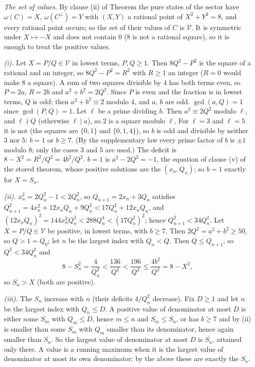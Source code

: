 \emph{The set of values.} By clause (ii) of Theorem  the pure states of the sector have $\omega(C) = X$, $\omega(C^{\perp}) = Y$ with $(X, Y)$ a rational point of $X^{2} + Y^{2} = 8$, and every rational point occurs; so the set of their values of $C$ is $\mathcal{V}$. It is symmetric under $X \mapsto -X$ and does not contain $0$ ($8$ is not a rational square), so it is enough to treat the positive values.

\emph{(i).} Let $X = P/Q \in \mathcal{V}$ in lowest terms, $P, Q \ge 1$. Then $8Q^{2} - P^{2}$ is the square of a rational and an integer, so $8Q^{2} - P^{2} = R^{2}$ with $R \ge 1$ an integer ($R = 0$ would make $8$ a square). A sum of two squares divisible by $4$ has both terms even, so $P = 2a$, $R = 2b$ and $a^{2} + b^{2} = 2Q^{2}$. Since $P$ is even and the fraction is in lowest terms, $Q$ is odd; then $a^{2} + b^{2} \equiv 2$ modulo $4$, and $a$, $b$ are odd. $\gcd(a, Q) = 1$ since $\gcd(P, Q) = 1$. Let $\ell$ be a prime dividing $b$. Then $a^{2} \equiv 2Q^{2}$ modulo $\ell$, and $\ell \nmid Q$ (otherwise $\ell \mid a$), so $2$ is a square modulo $\ell$. For $\ell = 3$ and $\ell = 5$ it is not (the squares are $\{0, 1\}$ and $\{0, 1, 4\}$), so $b$ is odd and divisible by neither $3$ nor $5$: $b = 1$ or $b \ge 7$. (By the supplementary law every prime factor of $b$ is $\pm 1$ modulo $8$; only the cases $3$ and $5$ are used.) The deficit is $8 - X^{2} = R^{2}/Q^{2} = 4b^{2}/Q^{2}$. $b = 1$ is $a^{2} - 2Q^{2} = -1$, the equation of clause (v) of the stored theorem, whose positive solutions are the $(x_{n}, Q_{n})$; so $b = 1$ exactly for $X = S_{n}$.

\emph{(ii).} $x_{n}^{2} = 2Q_{n}^{2} - 1 < 2Q_{n}^{2}$, so $Q_{n+1} = 2x_{n} + 3Q_{n}$ satisfies $Q_{n+1}^{2} = 4x_{n}^{2} + 12x_{n}Q_{n} + 9Q_{n}^{2} < 17Q_{n}^{2} + 12x_{n}Q_{n}$, and $(12x_{n}Q_{n})^{2} = 144x_{n}^{2}Q_{n}^{2} < 288Q_{n}^{4} < (17Q_{n}^{2})^{2}$; hence $Q_{n+1}^{2} < 34Q_{n}^{2}$. Let $X = P/Q \in \mathcal{V}$ be positive, in lowest terms, with $b \ge 7$. Then $2Q^{2} = a^{2} + b^{2} \ge 50$, so $Q > 1 = Q_{0}$; let $n$ be the largest index with $Q_{n} < Q$. Then $Q \le Q_{n+1}$, so $Q^{2} < 34Q_{n}^{2}$ and
\[
8 - S_{n}^{2} = \frac{4}{Q_{n}^{2}} < \frac{136}{Q^{2}} < \frac{196}{Q^{2}} \le \frac{4b^{2}}{Q^{2}} = 8 - X^{2},
\]
so $S_{n} > X$ (both are positive).

\emph{(iii).} The $S_{n}$ increase with $n$ (their deficits $4/Q_{n}^{2}$ decrease). Fix $D \ge 1$ and let $n$ be the largest index with $Q_{n} \le D$. A positive value of denominator at most $D$ is either some $S_{m}$ with $Q_{m} \le D$, hence $m \le n$ and $S_{m} \le S_{n}$, or has $b \ge 7$ and by (ii) is smaller than some $S_{m}$ with $Q_{m}$ smaller than its denominator, hence again smaller than $S_{n}$. So the largest value of denominator at most $D$ is $S_{n}$, attained only there. A value is a running maximum when it is the largest value of denominator at most its own denominator; by the above these are exactly the $S_{n}$.
